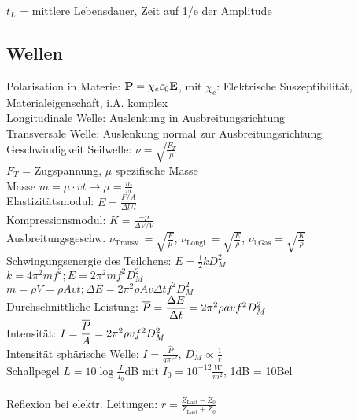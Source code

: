 \documentclass[fs, footer]{latex4ei}
\begin{document}
\begin{multicols*}{4}
$t_L$ = mittlere Lebensdauer, Zeit auf 1/e der Amplitude\\

\subsection{Wellen}
Polarisation in Materie: $\textbf{P} = \chi_e\varepsilon_0\textbf{E}$, mit $\chi_e$: Elektrische Suszeptibilität, Materialeigenschaft, i.A. komplex\\
Longitudinale Welle: Auslenkung in Ausbreitungsrichtung\\
Transversale Welle: Auslenkung normal zur Ausbreitungsrichtung\\
Geschwindigkeit Seilwelle: $\nu = \sqrt{\frac{F_T}{\mu}}$\\ 
$F_T$ = Zugspannung, $\mu$ spezifische Masse\\ %
Masse $m = \mu\cdot vt \rightarrow \mu = \frac{m}{vt}$\\
Elastizitätsmodul: $E = \frac{F / A}{\Delta l / l}$\\
Kompressionsmodul: $K = \frac{-p}{\Delta V / V}$\\
Ausbreitungsgeschw. $\nu_{\text{Transv.}} = \sqrt{\frac{F}{\mu}}$, $\nu_{\text{Longi.}} = \sqrt{\frac{E}{\rho}}$, $\nu_\text{l,Gas} = \sqrt{\frac{K}{\rho}}$\\ %
Schwingungsenergie des Teilchens: $E = \frac{1}{2}kD_M^2$\\
$k = 4\pi ^2mf^2; E = 2\pi^2mf^2D_M^2$\\
$m = \rho V = \rho A v t; \Delta E = 2\pi^2 \rho A v \Delta tf^2D_M^2$\\
Durchschnittliche Leistung: $\overline{P} = \dfrac{\Delta E}{\Delta t} = 2\pi ^2 \rho a v f^2 D_M^2$\\
Intensität: $ I = \dfrac{\overline{P}}{A} = 2\pi^2\rho v f^2D_M^2$\\
Intensität sphärische Welle: $I = \frac{\hat{P}}{q\pi r^2}$, $D_M \propto \frac{1}{r}$\\
Schallpegel $L = 10\log{\frac{I}{I_0}}$dB mit $I_0 = 10^{-12}\frac{W}{m^2}$, 1dB = 10Bel\\
\\
Reflexion bei elektr. Leitungen: $ r = \frac{Z_{\text{Last}}-Z_0}{Z_{\text{Last}}+Z_0}$\\


\end{multicols*}
\end{document}
